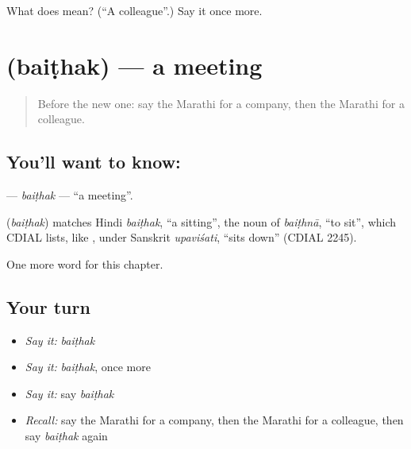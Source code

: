 \begin{tcolorbox}[breakable,colback=teal!4,colframe=teal!35!black,title={Before you move on}]
What does  mean? (\textquotedblleft{}A colleague\textquotedblright{}.) Say it once more.
\end{tcolorbox}
\section[\texorpdfstring{\mr{बैठक} (baiṭhak)}{बैठक (baiṭhak)}]{ (baiṭhak) — a meeting}

\label{lesson:MR-C192-baithak}



\begin{quote}
Before the new one: say the Marathi for a company, then the Marathi for a colleague.
\end{quote}

\subsection*{You'll want to know: }
\textbf{} — \emph{baiṭhak} — \textquotedblleft{}a meeting\textquotedblright{}.

\begin{cousinweb}
\textbf{} (\emph{baiṭhak}) matches Hindi \emph{baiṭhak}, \textquotedblleft{}a sitting\textquotedblright{}, the noun of \emph{baiṭhnā}, \textquotedblleft{}to sit\textquotedblright{}, which CDIAL lists, like \textbf{}, under Sanskrit \emph{upaviśati}, \textquotedblleft{}sits down\textquotedblright{} (CDIAL 2245).
\end{cousinweb}

\begin{grammarlens}[title={What you've built}]
One more word for this chapter.
\end{grammarlens}

\subsection*{Your turn}
\begin{itemize}
\raggedright
  \item \emph{Say it:} \emph{baiṭhak}
  \item \emph{Say it:} \emph{baiṭhak}, once more
  \item \emph{Say it:} say \emph{baiṭhak}
  \item \emph{Recall:} say the Marathi for a company, then the Marathi for a colleague, then say \emph{baiṭhak} again
\end{itemize}

